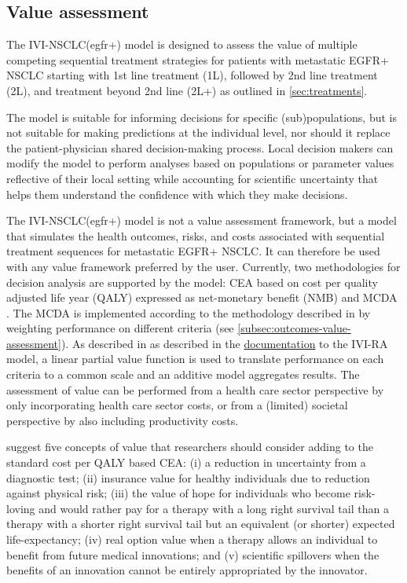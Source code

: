 \documentclass[11pt,final,fleqn]{article}\usepackage[]{graphicx}\usepackage[]{color}
\theoremstyle{plain}
\begin{document}
{\subsection{Value assessment}
The IVI-NSCLC(egfr+) model is designed to assess the value of multiple competing sequential treatment strategies for patients with metastatic EGFR+ NSCLC starting with 1st line treatment (1L), followed by 2nd line treatment (2L), and treatment beyond 2nd line (2L+) as outlined in \autoref{sec:treatments}.

The model is suitable for informing decisions for specific (sub)populations, but is not suitable for making predictions at the individual level, nor should it replace the patient-physician shared decision-making process. Local decision makers can modify the model to perform analyses based on populations or parameter values reflective of their local setting while accounting for scientific uncertainty that helps them understand the confidence with which they make decisions. 
 
The IVI-NSCLC(egfr+) model is not a value assessment framework, but a model that simulates the health outcomes, risks, and costs associated with sequential treatment sequences for metastatic EGFR+ NSCLC. It can therefore be used with any value framework preferred by the user. Currently, two methodologies for decision analysis are supported by the model: CEA based on cost per quality adjusted life year (QALY) expressed as net-monetary benefit (NMB) and MCDA \citep{keeney1993decisions}. The MCDA is implemented according to the methodology described in \citet{thokala2016multiple} by weighting performance on different criteria (see \autoref{subsec:outcomes-value-assessment}). As described in as described in the \href{https://innovationvalueinitiative.github.io/IVI-RA/model-description/model-description.pdf}{documentation} to the IVI-RA model, a linear partial value function is used to translate performance on each criteria to a common scale and an additive model aggregates results. The assessment of value can be performed from a health care sector perspective by only incorporating health care sector costs, or from a (limited) societal perspective by also including productivity costs.

\citet{garrison2017toward} suggest five concepts of value that researchers should consider adding to the standard cost per QALY based CEA: (i) a reduction in uncertainty from a diagnostic test; (ii) insurance value for healthy individuals due to reduction against physical risk; (iii) the value of hope for individuals who become risk-loving and would rather pay for a therapy with a long right survival tail than a therapy with a shorter right survival tail but an equivalent (or shorter) expected life-expectancy; (iv) real option value when a therapy allows an individual to benefit from future medical innovations; and (v) scientific spillovers when the benefits of an innovation cannot be entirely appropriated by the innovator.

}
\end{document}
